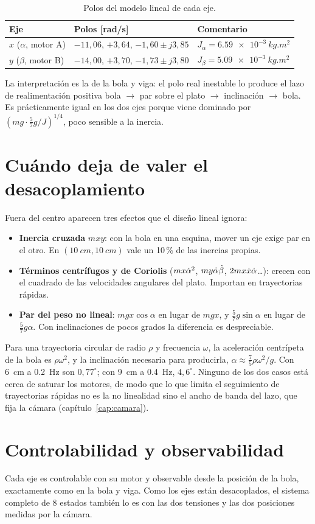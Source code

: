 \begin{table}[H]
\centering\small
\begin{tabular}{@{}lll@{}}
\toprule
Eje & Polos [rad/s] & Comentario\\
\midrule
$x$ ($\alpha$, motor A) & $-11{,}06$, $+3{,}64$, $-1{,}60\pm j3{,}85$ & $J_\alpha=\SI{6.59e-3}{kg.m^2}$\\
$y$ ($\beta$, motor B) & $-14{,}00$, $+3{,}70$, $-1{,}73\pm j3{,}80$ & $J_\beta=\SI{5.09e-3}{kg.m^2}$\\
\bottomrule
\end{tabular}
\caption{Polos del modelo lineal de cada eje.}
\label{tab:polos}
\end{table}

La interpretación es la de la bola y viga: el polo real inestable lo produce el lazo de realimentación positiva bola $\to$ par sobre el plato $\to$ inclinación $\to$ bola. Es prácticamente igual en los dos ejes porque viene dominado por $\left(mg\cdot\tfrac57g/J\right)^{1/4}$, poco sensible a la inercia.

\section{Cuándo deja de valer el desacoplamiento}

Fuera del centro aparecen tres efectos que el diseño lineal ignora:
\begin{itemize}
  \item \textbf{Inercia cruzada} $mxy$: con la bola en una esquina, mover un eje exige par en el otro. En $(\SI{10}{cm},\SI{10}{cm})$ vale un 10\,\% de las inercias propias.
  \item \textbf{Términos centrífugos y de Coriolis} ($mx\dot{\alpha}^2$, $my\dot{\alpha}\dot{\beta}$, $2mx\dot{x}\dot{\alpha}$\ldots): crecen con el cuadrado de las velocidades angulares del plato. Importan en trayectorias rápidas.
  \item \textbf{Par del peso no lineal}: $mgx\cos\alpha$ en lugar de $mgx$, y $\tfrac57g\sin\alpha$ en lugar de $\tfrac57g\alpha$. Con inclinaciones de pocos grados la diferencia es despreciable.
\end{itemize}
Para una trayectoria circular de radio $\rho$ y frecuencia $\omega$, la aceleración centrípeta de la bola es $\rho\omega^2$, y la inclinación necesaria para producirla, $\alpha\approx\tfrac75\rho\omega^2/g$. Con \SI{6}{cm} a \SI{0.2}{Hz} son $0{,}77^\circ$; con \SI{9}{cm} a \SI{0.4}{Hz}, $4{,}6^\circ$. Ninguno de los dos casos está cerca de saturar los motores, de modo que lo que limita el seguimiento de trayectorias rápidas no es la no linealidad sino el ancho de banda del lazo, que fija la cámara (capítulo~\ref{cap:camara}).

\section{Controlabilidad y observabilidad}

Cada eje es controlable con su motor y observable desde la posición de la bola, exactamente como en la bola y viga. Como los ejes están desacoplados, el sistema completo de 8 estados también lo es con las dos tensiones y las dos posiciones medidas por la cámara.
